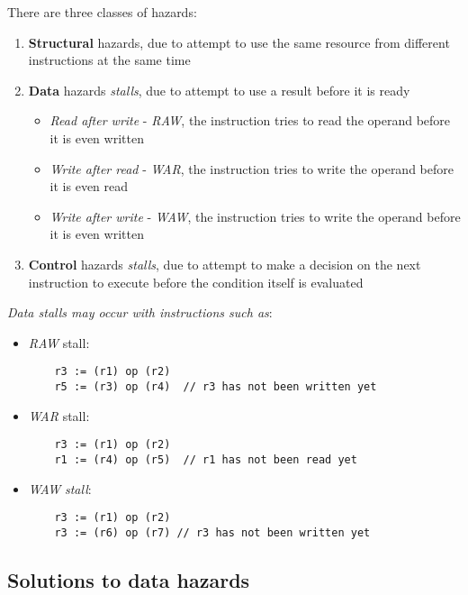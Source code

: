 \documentclass[english]{article}
\begin{document}
There are three classes of hazards:
\begin{enumerate}
  \item \textbf{Structural} hazards, due to attempt to use the same resource from different instructions at the same time
  \item \textbf{Data} hazards \textit{stalls}, due to attempt to use a result before it is ready
        \begin{itemize}
          \item \textit{Read after write} - \textit{RAW}, the instruction tries to read the operand before it is even written
          \item \textit{Write after read} - \textit{WAR}, the instruction tries to write the operand before it is even read
          \item \textit{Write after write} - \textit{WAW}, the instruction tries to write the operand before it is even written
        \end{itemize}
  \item \textbf{Control} hazards \textit{stalls}, due to attempt to make a decision on the next instruction to execute before the condition itself is evaluated
\end{enumerate}

\bigskip
\textit{Data stalls may occur with instructions such as}:
\begin{itemize}
  \item \textit{RAW} stall:
        \begin{verbatim}
    r3 := (r1) op (r2)
    r5 := (r3) op (r4)  // r3 has not been written yet\end{verbatim}

  \item \textit{WAR} stall:
        \begin{verbatim}
    r3 := (r1) op (r2)
    r1 := (r4) op (r5)  // r1 has not been read yet \end{verbatim}
  \item \textit{WAW}  \textit{stall}:
        \begin{verbatim}
    r3 := (r1) op (r2)
    r3 := (r6) op (r7) // r3 has not been written yet \end{verbatim}
\end{itemize}

\subsection{Solutions to data hazards}
\end{document}
